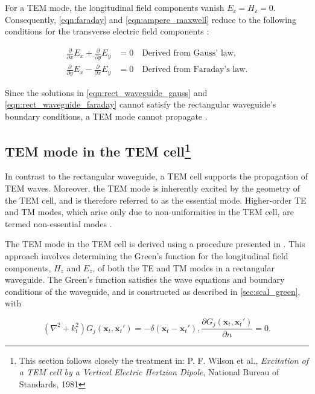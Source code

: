 For a TEM mode, the longitudinal field components vanish $E_\mathrm{z}=H_\mathrm{z}=0$. Consequently, \eqref{eqn:faraday} and \eqref{eqn:ampere_maxwell} reduce to the following conditions for the transverse electric field components \cite[p.~427]{Griffiths_2024}:

\begin{align}
	\frac{\partial}{\partial x}E_x+\frac{\partial}{\partial y}E_y&=0\quad\text{Derived from Gauss' law}\label{eqn:rect_waveguide_gauss},\\
	\frac{\partial}{\partial y}E_x-\frac{\partial}{\partial x}E_y&=0\quad\text{Derived from Faraday's law}\label{eqn:rect_waveguide_faraday}.
\end{align}

Since the solutions in \eqref{eqn:rect_waveguide_gauss} and \eqref{eqn:rect_waveguide_faraday} cannot satisfy the rectangular waveguide's boundary conditions, a TEM mode cannot propagate \cite[p.~427]{Griffiths_2024}.

\subsection[TEM mode in the TEM cell]{TEM mode in the TEM cell\protect\footnote{This section follows closely the treatment in: P. F. Wilson et al., \textit{Excitation of a TEM cell by a Vertical Electric Hertzian Dipole}, National Bureau of Standards, 1981}}\label{sec:tem_mode_tem_cell}

In contrast to the rectangular waveguide, a TEM cell supports the propagation of TEM waves. Moreover, the TEM mode is inherently excited by the geometry of the TEM cell, and is therefore referred to as the essential mode. Higher-order TE and TM modes, which arise only due to non-uniformities in the TEM cell, are termed non-essential modes \cite{990711}.

The TEM mode in the TEM cell is derived using a procedure presented in \cites{Tippet_Chang_Crawford_1976,Wilson_1981}. This approach involves determining the Green's function for the longitudinal field components, $H_z$ and $E_z$, of both the TE and TM modes in a rectangular waveguide. The Green's function satisfies the wave equations and boundary conditions of the waveguide, and is constructed as described in \cref{sec:scal_green}, with

\begin{subequations}
	
	\begin{equation}
		(\nabla^2 + k_{t}^2) G_j (\mathbf{x}_t, \mathbf{x}_t') = -\delta(\mathbf{x}_t - \mathbf{x}_t'),
	\end{equation}
	
	\begin{equation}
		\frac{\partial G_j(\mathbf{x}_t, \mathbf{x}_t')}{\partial n}=0.
		\label{eqn:bc_tem} 
	\end{equation}

\end{subequations}


